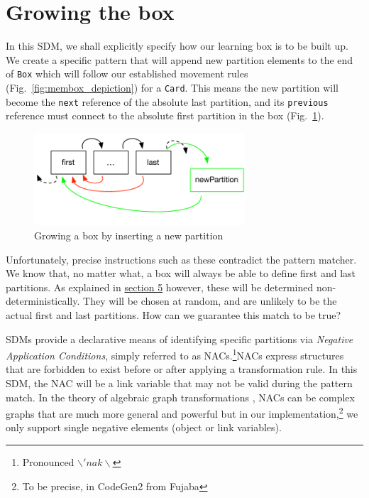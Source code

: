 \newpage
\section{Growing the box}
\genHeader

In this SDM, we shall explicitly specify how our learning box is to be built up. We create a specific pattern that will append new partition elements
to the end of \texttt{Box} which will follow our established movement rules (Fig.~\ref{fig:membox_depiction}) for a \texttt{Card}. This means the new partition
will become the \texttt{next} reference of the absolute last partition, and its \texttt{previous} reference must connect to the absolute first partition in the
box (Fig.~\ref{fig:goal_grow}).

\begin{figure}[htbp]
 	\centering
  	\includegraphics[width=0.7\textwidth]{growBoxNACGoal.pdf}
	\caption{Growing a box by inserting a new partition}
	\label{fig:goal_grow}
\end{figure}
\FloatBarrier

Unfortunately, precise instructions such as these contradict the pattern matcher. We know that, no matter what, a box will always be able to
define first and last partitions. As explained in \hyperlink{sec:emptyPartition}{section 5} however, these will be determined non-deterministically. They will
be chosen at random, and are unlikely to be the actual first and last partitions. How can we guarantee this match to be true?

SDMs provide a declarative means of identifying specific partitions via \emph{Negative Application Conditions}, simply referred to as
\mbox{NAC}s.\footnote{Pronounced $\backslash 'nak \backslash$}\mbox{NAC}s express structures that are forbidden to exist before or after applying a
transformation rule. In this SDM, the \mbox{NAC} will be a link variable that may not be valid during the pattern match. In the theory of algebraic
graph transformations \cite{EEPT06}, \mbox{NACs} can be complex graphs that are much more general and powerful but in our implementation,\footnote{To be
precise, in CodeGen2 from Fujaba} we only support single negative elements (object or link variables).


